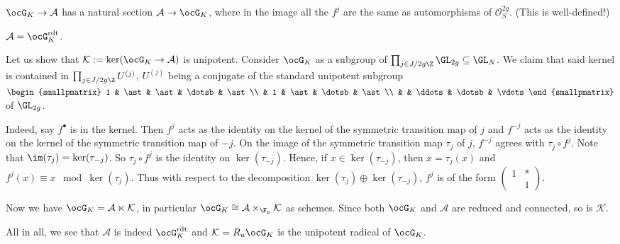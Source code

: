 \documentclass[a4paper]{scrartcl} %
\numberwithin{equation}{section}
\begin{document}
$\ocG_K\to\mathcal{A}$ has a natural section $\mathcal{A}\to\ocG_K$, where in the image all the $f^j$ are the same as automorphisms of $\mathcal{O}_S^{2g}$. (This is well-defined!)

\begin{Proposition}\label{GKrdt}
  $\mathcal{A}=\ocG_K^\mathrm{rdt}$.
\end{Proposition}

\begin{Proof}
  Let us show that $\mathcal{K}:=\ker(\ocG_K\to\mathcal{A})$ is unipotent. Consider $\ocG_K$ as a subgroup of $\prod_{j\in J/2g\Z}\GL_{2g}\subseteq \GL_{N}$. We claim that said kernel is contained in $\prod_{j\in J/2g\Z} U^{(j)}$, $U^{(j)}$ being a conjugate of the standard unipotent subgroup $
  \begin{smallpmatrix}
    1 & \ast & \ast & \dotsb & \ast \\
    & 1 & \ast & \dotsb & \ast \\
     &  & \ddots & \dotsb & \vdots
  \end{smallpmatrix}
$ of $\GL_{2g}$.

  Indeed, say $f^\bullet$ is in the kernel. Then $f^j$ acts as the identity on the kernel of the symmetric transition map of $j$ and $f^{-j}$ acts as the identity on the kernel of the symmetric transition map of $-j$. On the image of the symmetric transition map $\tau_j$ of $j$, $f^{-j}$ agrees with $\tau_j\circ f^j$. Note that $\im(\tau_j)=\ker(\tau_{-j})$. So $\tau_j\circ f^j$ is the identity on $\ker(\tau_{-j})$. Hence, if $x\in \ker(\tau_{-j})$, then $x=\tau_j(x)$ and $f^j(x)\equiv x \mod \ker(\tau_j)$. Thus with respect to the decomposition $\ker(\tau_j)\oplus\ker(\tau_{-j})$, $f^j$ is of the form $
  \begin{pmatrix}
    1 & \ast \\
    & 1
  \end{pmatrix}$.

  Now we have $\ocG_K=\mathcal{A}\ltimes\mathcal{K}$, in particular $\ocG_K\cong\mathcal{A}\times_{\F_p} \mathcal{K}$ as schemes. Since both $\ocG_K$ and $\mathcal{A}$ are reduced and connected, so is $\mathcal{K}$.

  All in all, we see that  $\mathcal{A}$ is indeed $\ocG_K^\mathrm{rdt}$ and $\mathcal{K}=R_u\ocG_K$ is the unipotent radical of $\ocG_K$.
\end{Proof}
\end{document}
